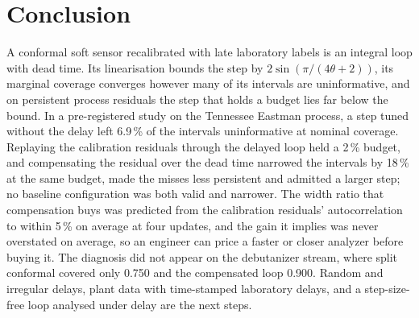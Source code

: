 \section{Conclusion}\label{sec:conclusion}

A conformal soft sensor recalibrated with late laboratory labels is an integral loop with dead
time. Its linearisation bounds the step by $2\sin(\pi/(4\theta+2))$, its marginal coverage
converges however many of its intervals are uninformative, and on persistent process residuals
the step that holds a budget lies far below the bound. In a pre-registered study on the Tennessee
Eastman process, a step tuned without the delay left 6.9\,\% of the intervals uninformative at
nominal coverage. Replaying the calibration residuals through the delayed loop held a 2\,\%
budget, and compensating the residual over the dead time narrowed the intervals by 18\,\% at the
same budget, made the misses less persistent and admitted a larger step; no baseline
configuration was both valid and narrower. The width ratio that compensation buys was predicted
from the calibration residuals' autocorrelation to within 5\,\% on average at four updates, and
the gain it implies was never overstated on average, so an engineer can price a faster or closer
analyzer before buying it. The diagnosis
did not appear on the debutanizer stream, where split conformal covered only 0.750 and the
compensated loop 0.900. Random and irregular delays, plant data with time-stamped laboratory
delays, and a step-size-free loop analysed under delay are the next steps.
